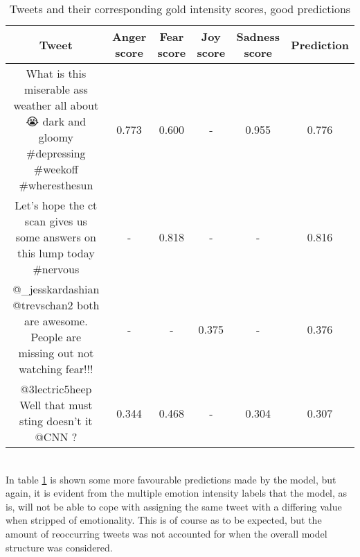 \begin{table}[h]
\begin{tabular}{c|c|c|c|c|c|}
Tweet & Anger score & Fear score & Joy score & Sadness score & Prediction  \\ \hline
\parbox[t]{6cm}{What is this miserable ass weather all about 😭 dark and gloomy \#depressing \#weekoff \#wheresthesun} & 0.773 & 0.600 & - & 0.955 & 0.776\\ \hline
\parbox[t]{6cm}{Let's hope the ct scan gives us some answers on this lump today \#nervous} & - & 0.818 & - & - & 0.816\\ \hline
\parbox[t]{6cm}{@\_jesskardashian @trevschan2 both are awesome.  People are missing out not watching fear!!!} & - & - & 0.375 & - & 0.376\\ \hline
\parbox[t]{6cm}{@3lectric5heep Well that must sting doesn't it @CNN ?} & 0.344 & 0.468 & - & 0.304 & 0.307
\end{tabular}
\caption{Tweets and their corresponding gold intensity scores, good predictions}
\label{tab:regerrorlow}
\end{table}\\
In table \ref{tab:regerrorlow} is shown some more favourable predictions made by the model, but again, it is evident from the multiple emotion intensity labels that the model, as is, will not be able to cope with assigning the same tweet with a differing value when stripped of emotionality. This is of course as to be expected, but the amount of reoccurring tweets was not accounted for when the overall model structure was considered.

